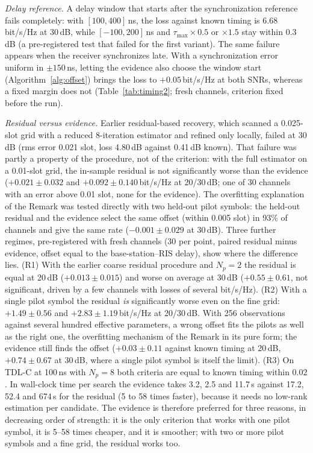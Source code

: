 \emph{Delay reference.} A delay window that starts after the synchronization reference fails completely:
with $[100,400]$\,ns, the loss against known timing is 6.68\,bit/s/Hz at 30\,dB, while $[-100,200]$\,ns and
$\tau_{\max}\times0.5$ or $\times1.5$ stay within 0.3\,dB (a pre-registered test that failed for the first variant). The
same failure appears when the receiver synchronizes late. With a synchronization error uniform in $\pm150$\,ns,
letting the evidence also choose the window start (Algorithm~\ref{alg:offset}) brings the loss to $+0.05$\,bit/s/Hz
at both SNRs, whereas a fixed margin does not (Table~\ref{tab:timing2}; fresh channels, criterion fixed before the run).

\emph{Residual versus evidence.} Earlier residual-based recovery, which scanned a 0.025-slot grid with a reduced
8-iteration estimator and refined only locally, failed at 30\,dB (rms error 0.021 slot, loss 4.80\,dB against 0.41\,dB
known). That failure was partly a property of the procedure, not of the criterion: with the full estimator on a
0.01-slot grid, the in-sample residual is not significantly worse than the evidence ($+0.021\pm0.032$ and
$+0.092\pm0.140$\,bit/s/Hz at 20/30\,dB; one of 30 channels with an error above 0.01 slot, none for the evidence).
The overfitting explanation of the Remark was tested directly with two held-out pilot symbols: the held-out residual
and the evidence select the same offset (within 0.005 slot) in 93\% of channels and give the same rate
($-0.001\pm0.029$ at 30\,dB). Three further regimes, pre-registered with fresh channels (30 per point, paired residual minus evidence, offset
equal to the base-station--RIS delay), show where the difference lies. (R1) With the earlier coarse residual
procedure and $N_p=2$ the residual is equal at 20\,dB ($+0.013\pm0.015$) and worse on average at 30\,dB
($+0.55\pm0.61$, not significant, driven by a few channels with losses of several bit/s/Hz). (R2) With a single
pilot symbol the residual \emph{is} significantly worse even on the fine grid: $+1.49\pm0.56$ and
$+2.83\pm1.19$\,bit/s/Hz at 20/30\,dB. With 256 observations against several hundred effective parameters, a wrong
offset fits the pilots as well as the right one, the overfitting mechanism of the Remark in its pure form; the
evidence still finds the offset ($+0.03\pm0.11$ against known timing at 20\,dB, $+0.74\pm0.67$ at 30\,dB, where a
single pilot symbol is itself the limit). (R3) On TDL-C at 100\,ns with $N_p=8$ both criteria are equal to known
timing within $0.02$. In wall-clock time per search the evidence takes 3.2, 2.5 and 11.7\,s against 17.2, 52.4 and
674\,s for the residual (5 to 58 times faster), because it needs no low-rank estimation per candidate. The evidence is
therefore preferred for three reasons, in decreasing order of strength: it is the only criterion that works with one
pilot symbol, it is 5--58 times cheaper, and it is smoother; with two or more pilot symbols and a fine grid, the
residual works too.

